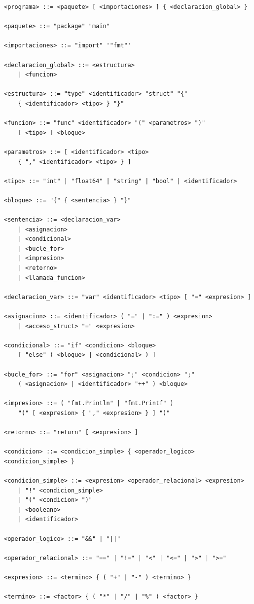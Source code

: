 \documentclass[11pt, a4paper]{article}
\begin{document}
\begin{lstlisting}[style=gramatica]
<programa> ::= <paquete> [ <importaciones> ] { <declaracion_global> }

<paquete> ::= "package" "main"

<importaciones> ::= "import" '"fmt"'

<declaracion_global> ::= <estructura>
    | <funcion>

<estructura> ::= "type" <identificador> "struct" "{"
    { <identificador> <tipo> } "}"

<funcion> ::= "func" <identificador> "(" <parametros> ")"
    [ <tipo> ] <bloque>

<parametros> ::= [ <identificador> <tipo>
    { "," <identificador> <tipo> } ]

<tipo> ::= "int" | "float64" | "string" | "bool" | <identificador>

<bloque> ::= "{" { <sentencia> } "}"

<sentencia> ::= <declaracion_var>
    | <asignacion>
    | <condicional>
    | <bucle_for>
    | <impresion>
    | <retorno>
    | <llamada_funcion>

<declaracion_var> ::= "var" <identificador> <tipo> [ "=" <expresion> ]

<asignacion> ::= <identificador> ( "=" | ":=" ) <expresion>
    | <acceso_struct> "=" <expresion>

<condicional> ::= "if" <condicion> <bloque>
    [ "else" ( <bloque> | <condicional> ) ]

<bucle_for> ::= "for" <asignacion> ";" <condicion> ";"
    ( <asignacion> | <identificador> "++" ) <bloque>

<impresion> ::= ( "fmt.Println" | "fmt.Printf" )
    "(" [ <expresion> { "," <expresion> } ] ")"

<retorno> ::= "return" [ <expresion> ]

<condicion> ::= <condicion_simple> { <operador_logico> <condicion_simple> }

<condicion_simple> ::= <expresion> <operador_relacional> <expresion>
    | "!" <condicion_simple>
    | "(" <condicion> ")"
    | <booleano>
    | <identificador>

<operador_logico> ::= "&&" | "||"

<operador_relacional> ::= "==" | "!=" | "<" | "<=" | ">" | ">="

<expresion> ::= <termino> { ( "+" | "-" ) <termino> }

<termino> ::= <factor> { ( "*" | "/" | "%" ) <factor> }


\end{lstlisting}
\end{document}

